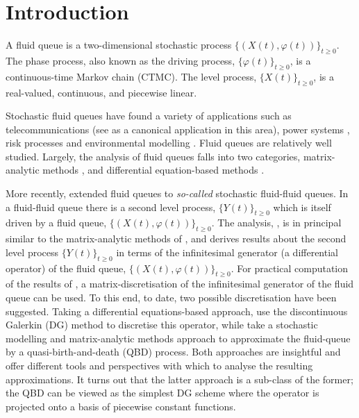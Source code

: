 \chapter{Introduction \label{ch:intro}} 
A fluid queue is a two-dimensional stochastic process \(\{(X(t),\varphi(t))\}_{t\geq0}\). The phase process, also known as the driving process, \(\{\varphi(t)\}_{t\geq0}\), is a continuous-time Markov chain (CTMC). The level process, \(\{X(t)\}_{t\geq0}\), is a real-valued, continuous, and piecewise linear. 

Stochastic fluid queues have found a variety of applications such as telecommunications (see \cite{anick1982} as a canonical application in this area), power systems \citep{hydro}, risk processes \citep{betal2005} and environmental modelling \citep{wurm2020}. Fluid queues are relatively well studied. Largely, the analysis of fluid queues falls into two categories, matrix-analytic methods \citep{ajr2005,ar2003,ar2004,bean2005b,bean2005,bot08,bean2009,dasilva2005,latouche2018}, and differential equation-based methods \citep{anick1982,kk1995,beanetal2019}. %

More recently, \cite{bo2014} extended fluid queues to \emph{so-called} stochastic fluid-fluid queues. In a fluid-fluid queue there is a second level process, \(\{Y(t)\}_{t\geq0}\) which is itself driven by a fluid queue, \(\{(X(t),\varphi(t))\}_{t\geq0}\). The analysis,  \citep{bo2014}, is in principal similar to the matrix-analytic methods of \citep{bean2005}, and derives results about the second level process \(\{Y(t)\}_{t\geq0}\) in terms of the infinitesimal generator (a differential operator) of the fluid queue, \(\{(X(t),\varphi(t))\}_{t\geq0}\). For practical computation of the results of \cite{bo2014}, a matrix-discretisation of the infinitesimal generator of the fluid queue can be used. To this end, to date, two possible discretisation have been suggested. Taking a differential equations-based approach, \cite{beanetal2019} use the discontinuous Galerkin (DG) method to discretise this operator, while \cite{bo2013} take a stochastic modelling and matrix-analytic methods approach to approximate the fluid-queue by a quasi-birth-and-death (QBD) process. Both approaches are insightful and offer different tools and perspectives with which to analyse the resulting approximations. It turns out that the latter approach is a sub-class of the former; the QBD can be viewed as the simplest DG scheme where the operator is projected onto a basis of piecewise constant functions.

